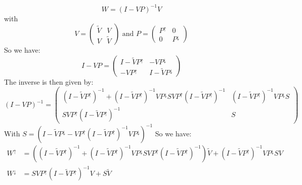\documentclass[12pt]{article}
\begin{document}
\noindent
$$W = (I-VP)^{-1}V$$
with
$$V = \begin{pmatrix}
\tilde{V} & V\\
V & \tilde{V}
\end{pmatrix}\text{ and } P = \begin{pmatrix}
P^\uparrow & 0\\
0 & P^\downarrow
\end{pmatrix}$$
So we have:
$$I-VP=\begin{pmatrix}
I - \tilde{V}P^\uparrow & -VP^\downarrow\\
-VP^\uparrow & I-\tilde{V}P^\downarrow
\end{pmatrix}$$
The inverse is then given by:
$$(I-VP)^{-1}=\begin{pmatrix}
(I-\tilde{V}P^\uparrow)^{-1} + (I-\tilde{V}P^\uparrow)^{-1}VP^\downarrow SVP^\uparrow(I-\tilde{V}P^\uparrow)^{-1} & (I-\tilde{V}P^\uparrow)^{-1}VP^\downarrow S\\
SVP^\uparrow(I-\tilde{V}P^\uparrow)^{-1} & S
\end{pmatrix}$$
With $S=(I-\tilde{V}P^\downarrow-VP^\uparrow (I-\tilde{V}P^\uparrow)^{-1}VP^\downarrow)^{-1}$
So we have:
\begin{align*}
W^\uparrow &= ((I-\tilde{V}P^\uparrow)^{-1} + (I-\tilde{V}P^\uparrow)^{-1}VP^\downarrow SVP^\uparrow(I-\tilde{V}P^\uparrow)^{-1} )\tilde{V} + (I-\tilde{V}P^\uparrow)^{-1}VP^\downarrow S V\\
W^\downarrow &= SVP^\uparrow(I-\tilde{V}P^\uparrow)^{-1}V + S\tilde{V}
\end{align*}
\end{document}
